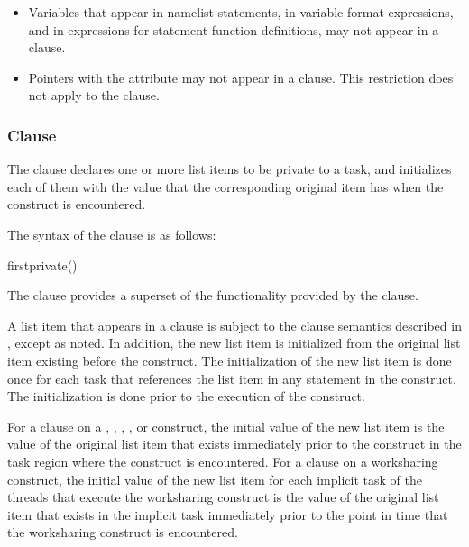 {{{{\begin{itemize}
\item Variables that appear in namelist statements, in variable format expressions, and in 
expressions for statement function definitions, may not appear in a  clause.

\item Pointers with the  attribute may not appear in a  clause. This 
restriction does not apply to the  clause. 
\fortranspecificend
\end{itemize}










\subsubsection{ Clause}
\label{subsubsec:firstprivate clause}
\summary
The  clause declares one or more list items to be private to a task, and 
initializes each of them with the value that the corresponding original item has when the 
construct is encountered. 

\syntax
The syntax of the  clause is as follows:

\begin{boxedcode}
firstprivate()
\end{boxedcode}

\descr
The  clause provides a superset of the functionality provided by the 
 clause. 

A list item that appears in a  clause is subject to the  clause 
semantics described in 
, 
except as noted. In addition, the 
new list item is initialized from the original list item existing before the construct. The 
initialization of the new list item is done once for each task that references the list item 
in any statement in the construct. The initialization is done prior to the execution of the 
construct.

For a  clause on a , ,
, , or  construct, the
initial value of the new list item is the value of the original list
item that exists immediately prior to the construct in the task region
where the construct is encountered. For a  clause
on a worksharing construct, the initial value of the new list item for
each implicit task of the threads that execute the worksharing
construct is the value of the original list item that exists in the
implicit task immediately prior to the point in time that the
worksharing construct is encountered.

}}}}
